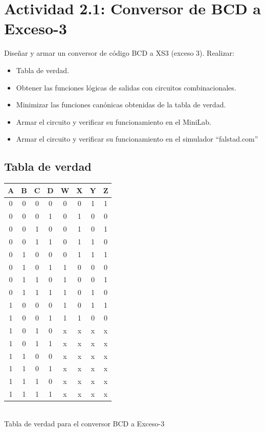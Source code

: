 \section{Actividad 2.1: Conversor de BCD a Exceso-3}

Diseñar y armar un conversor de código BCD a XS3 (exceso 3).
Realizar:
\begin{itemize}
    \item Tabla de verdad.
    \item Obtener las funciones lógicas de salidas con circuitos combinacionales.
    \item Minimizar las funciones canónicas obtenidas de la tabla de verdad.
    \item Armar el circuito y verificar su funcionamiento en el MiniLab.
    \item Armar el circuito y verificar su funcionamiento en el simulador “falstad.com”
\end{itemize}


\subsection{Tabla de verdad}

\begin{center}
\centering
\begin{tabular}{c c c c || c c c c}
A & B & C & D & W & X & Y & Z \\
\hline
0 & 0 & 0 & 0 & 0 & 0 & 1 & 1 \\
0 & 0 & 0 & 1 & 0 & 1 & 0 & 0 \\
0 & 0 & 1 & 0 & 0 & 1 & 0 & 1 \\
0 & 0 & 1 & 1 & 0 & 1 & 1 & 0 \\
0 & 1 & 0 & 0 & 0 & 1 & 1 & 1 \\
0 & 1 & 0 & 1 & 1 & 0 & 0 & 0 \\
0 & 1 & 1 & 0 & 1 & 0 & 0 & 1 \\
0 & 1 & 1 & 1 & 1 & 0 & 1 & 0 \\
1 & 0 & 0 & 0 & 1 & 0 & 1 & 1 \\
1 & 0 & 0 & 1 & 1 & 1 & 0 & 0 \\
1 & 0 & 1 & 0 & x & x & x & x \\
1 & 0 & 1 & 1 & x & x & x & x \\
1 & 1 & 0 & 0 & x & x & x & x \\
1 & 1 & 0 & 1 & x & x & x & x \\
1 & 1 & 1 & 0 & x & x & x & x \\
1 & 1 & 1 & 1 & x & x & x & x \\
\end{tabular}
\\Tabla de verdad para el conversor BCD a Exceso-3
\end{center}

